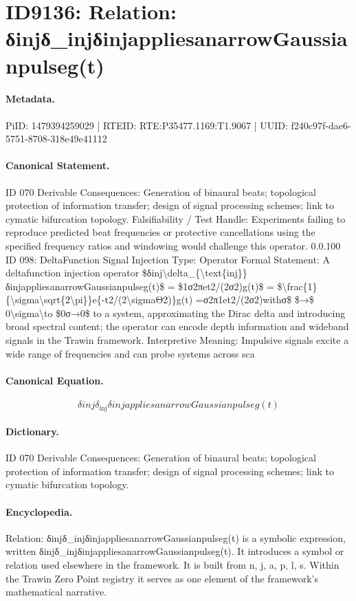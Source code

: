 \section*{ID9136: Relation: δinjδ\_injδinjappliesanarrowGaussianpulseg(t)}
\paragraph{Metadata.}
PiID: 1479394259029 | RTEID: RTE:P35477.1169:T1.9067 | UUID: f240c97f-dae6-5751-8708-318e49e41112

\paragraph{Canonical Statement.}
ID 070 Derivable Consequences: Generation of binaural beats; topological protection of information transfer; design of signal processing schemes; link to cymatic bifurcation topology. Falsifiability / Test Handle: Experiments failing to reproduce predicted beat frequencies or protective cancellations using the specified frequency ratios and windowing would challenge this operator. 0.0.100 ID 098: DeltaFunction Signal Injection Type: Operator Formal Statement: A deltafunction injection operator \$δinj\textbackslash{}delta\_\{\textbackslash{}text\{inj\}\}δinjappliesanarrowGaussianpulseg(t)\$ = \$1σ2πet2/(2σ2)g(t)\$ = \$\textbackslash{}frac\{1\}\{\textbackslash{}sigma\textbackslash{}sqrt\{2\textbackslash{}pi\}\}e\{-t2/(2\textbackslash{}sigmaΘ2)\}g(t) =σ2π1et2/(2σ2)withσ\$ \$→\$ 0\textbackslash{}sigma\textbackslash{}to \$0σ→0\$ to a system, approximating the Dirac delta and introducing broad spectral content; the operator can encode depth information and wideband signals in the Trawin framework. Interpretive Meaning: Impulsive signals excite a wide range of frequencies and can probe systems across sca

\paragraph{Canonical Equation.}
\[
δinj\delta_{\text{inj}}δinjappliesanarrowGaussianpulseg(t)
\]

\paragraph{Dictionary.}
ID 070 Derivable Consequences: Generation of binaural beats; topological protection of information transfer; design of signal processing schemes; link to cymatic bifurcation topology.

\paragraph{Encyclopedia.}
Relation: δinjδ\_injδinjappliesanarrowGaussianpulseg(t) is a symbolic expression, written δinjδ\_injδinjappliesanarrowGaussianpulseg(t). It introduces a symbol or relation used elsewhere in the framework. It is built from n, j, a, p, l, s. Within the Trawin Zero Point registry it serves as one element of the framework's mathematical narrative.
